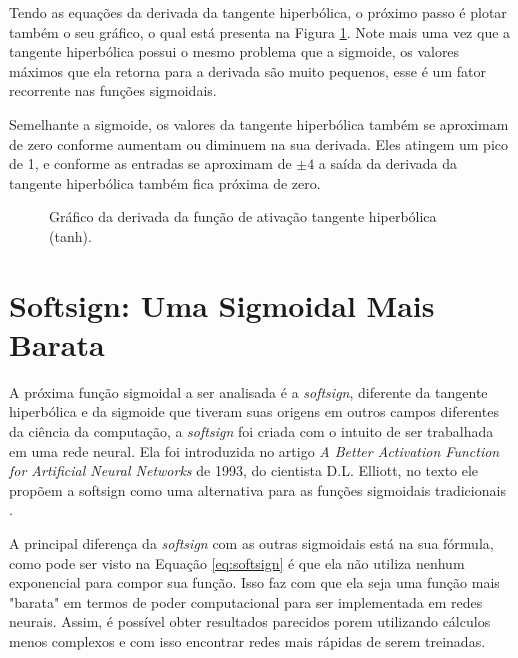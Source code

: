 Tendo as equações da derivada da tangente hiperbólica, o próximo passo é plotar também o seu gráfico, o qual está presenta na Figura \ref{fig:tanh-derivada}. Note mais uma vez que a tangente hiperbólica possui o mesmo problema que a sigmoide, os valores máximos que ela retorna para a derivada são muito pequenos, esse é um fator recorrente nas funções sigmoidais.

Semelhante a sigmoide, os valores da tangente hiperbólica também se aproximam de zero conforme aumentam ou diminuem na sua derivada. Eles atingem um pico de 1, e conforme as entradas se aproximam de $\pm 4$ a saída da derivada da tangente hiperbólica também fica próxima de zero.

\begin{figure}[h!]
    \centering
    \caption{Gráfico da derivada da função de ativação tangente hiperbólica (tanh).}
    \label{fig:tanh-derivada}
\end{figure}

\section{Softsign: Uma Sigmoidal Mais Barata}

A próxima função sigmoidal a ser analisada é a \textit{softsign}, diferente da tangente hiperbólica e da sigmoide que tiveram suas origens em outros campos diferentes da ciência da computação, a \textit{softsign} foi criada com o intuito de ser trabalhada em uma rede neural. Ela foi introduzida no artigo \textit{A Better Activation Function for Artificial Neural Networks} de 1993, do cientista D.L. Elliott, no texto ele propõem a softsign como uma alternativa para as funções sigmoidais tradicionais \parencite{Softsign1998}.

A principal diferença da \textit{softsign} com as outras sigmoidais está na sua fórmula, como pode ser visto na Equação \ref{eq:softsign} é que ela não utiliza nenhum exponencial para compor sua função. Isso faz com que ela seja uma função mais "barata" em termos de poder computacional para ser implementada em redes neurais. Assim, é possível obter resultados parecidos porem utilizando cálculos menos complexos e com isso encontrar redes mais rápidas de serem treinadas.

